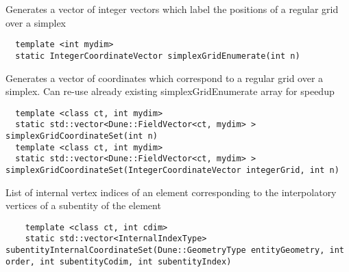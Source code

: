 \noindent
Generates a vector of integer vectors which label the positions of a regular grid over a simplex \\

\begin{mybox}
\begin{lstlisting}
  template <int mydim>
  static IntegerCoordinateVector simplexGridEnumerate(int n)
\end{lstlisting}
\end{mybox}

\noindent
Generates a vector of coordinates which correspond to a regular grid over a simplex. Can re-use already existing simplexGridEnumerate array for speedup \\

\begin{mybox}
\begin{lstlisting}
  template <class ct, int mydim>
  static std::vector<Dune::FieldVector<ct, mydim> > simplexGridCoordinateSet(int n)
  template <class ct, int mydim>
  static std::vector<Dune::FieldVector<ct, mydim> > simplexGridCoordinateSet(IntegerCoordinateVector integerGrid, int n)
\end{lstlisting}
\end{mybox}


\noindent
List of internal vertex indices of an element corresponding to the interpolatory vertices of a subentity of the element

\begin{mybox}
\begin{lstlisting}
    template <class ct, int cdim>
    static std::vector<InternalIndexType> subentityInternalCoordinateSet(Dune::GeometryType entityGeometry, int order, int subentityCodim, int subentityIndex)
\end{lstlisting}
\end{mybox}


